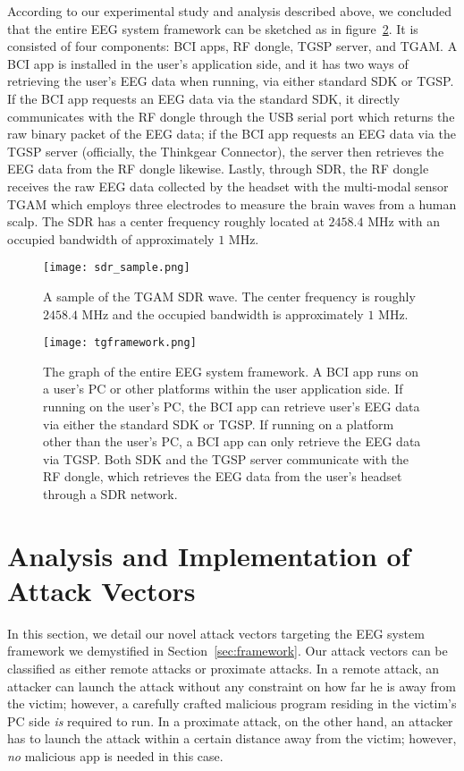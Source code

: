 %
\indent According to our experimental study and analysis described above, we concluded that the entire EEG system framework can be sketched as in figure~\ref{fig:tgframework}. It is consisted of four components: BCI apps, RF dongle, TGSP server, and TGAM. A BCI app is installed in the user's application side, and it has two ways of retrieving the user's EEG data when running, via either standard SDK or TGSP. If the BCI app requests an EEG data via the standard SDK, it directly communicates with the RF dongle through the USB serial port which returns the raw binary packet of the EEG data; if the BCI app requests an EEG data via the TGSP server (officially, the Thinkgear Connector), the server then retrieves the EEG data from the RF dongle likewise. Lastly, through SDR, the RF dongle receives the raw EEG data collected by the headset with the multi-modal sensor TGAM which employs three electrodes to measure the brain waves from a human scalp. The SDR has a center frequency roughly located at $2458.4$ MHz with an occupied bandwidth of approximately $1$ MHz.

\begin{figure}[!htb]
        \centering
        \texttt{[image: sdr\_sample.png]}
        \caption{A sample of the TGAM SDR wave. The center frequency is roughly $2458.4$ MHz and the occupied bandwidth is approximately $1$ MHz.}
        \label{fig:sdrsample}
\end{figure}

\begin{figure}[!htb]
        \centering
        \texttt{[image: tgframework.png]}
        \caption{The graph of the entire EEG system framework. A BCI app runs on a user's PC or other platforms within the user application side. If running on the user's PC, the BCI app can retrieve user's EEG data via either the standard SDK or TGSP. If running on a platform other than the user's PC, a BCI app can only retrieve the EEG data via TGSP. Both SDK and the TGSP server communicate with the RF dongle, which retrieves the EEG data from the user's headset through a SDR network.}
        \label{fig:tgframework}
\end{figure}

\section{Analysis and Implementation of Attack Vectors}
\label{sec:attack}

In this section, we detail our novel attack vectors targeting the EEG system framework we demystified in Section~\ref{sec:framework}. Our attack vectors can be classified as either remote attacks or proximate attacks. In a remote attack, an attacker can launch the attack without any constraint on how far he is away from the victim; however, a carefully crafted malicious program residing in the victim's PC side \emph{is} required to run. In a proximate attack, on the other hand, an attacker has to launch the attack within a certain distance away from the victim; however, \emph{no} malicious app is needed in this case. %

